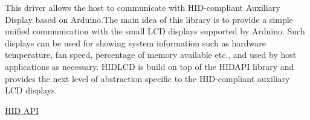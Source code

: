 This driver allows the host to communicate with H\+I\+D-\/compliant Auxiliary Display based on Arduino.\+The main idea of this library is to provide a simple unified communication with the small L\+CD displays supported by Arduino. Such displays can be used for showing system information such as hardware temperature, fan speed, percentage of memory available etc., and used by host applications as necessary. H\+I\+D\+L\+CD is build on top of the H\+I\+D\+A\+PI library and provides the next level of abstraction specific to the H\+I\+D-\/compliant auxiliary L\+CD displays.

\hyperlink{group__API}{H\+ID A\+PI} 